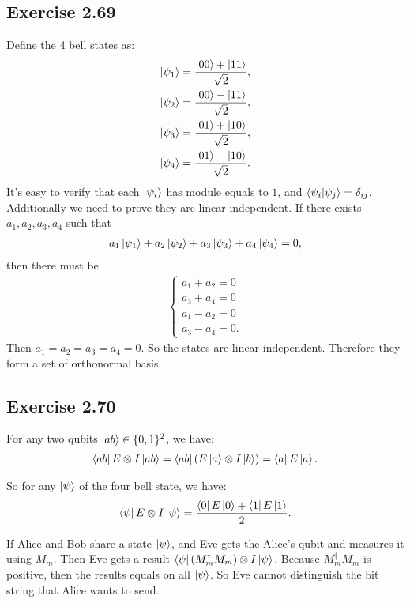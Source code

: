 \subsection*{Exercise 2.69}
Define the 4 bell states as:
\begin{align}
    \ket{\psi_1}=\frac{\ket{00}+\ket{11}}{\sqrt 2},\\
    \ket{\psi_2}=\frac{\ket{00}-\ket{11}}{\sqrt 2},\\
    \ket{\psi_3}=\frac{\ket{01}+\ket{10}}{\sqrt 2},\\
    \ket{\psi_4}=\frac{\ket{01}-\ket{10}}{\sqrt 2}.
\end{align}
It's easy to verify that each $\ket{\psi_i}$ has module equals to $1$, and $\bra{\psi_i}\ket{\psi_j}=\delta_{ij}$. Additionally we need to prove they are linear independent. If there exists $a_1,a_2,a_3,a_4$ such that
\begin{align}
    a_1\ket{\psi_1}+a_2\ket{\psi_2}+a_3\ket{\psi_3}+a_4\ket{\psi_4}=0,
\end{align}
then there must be
\begin{align}
    \left\{\begin{array}{l}
a_{1}+a_{2}=0 \\
a_{3}+a_{4}=0 \\
a_{1}-a_{2}=0 \\
a_{3}-a_{4}=0 .
\end{array}\right.
\end{align}
Then $a_1=a_2=a_3=a_4=0$. So the states are linear independent. Therefore they form a set of orthonormal basis.

\subsection*{Exercise 2.70}

For any two qubits $\ket{ab}\in\{0,1\}^2$, we have:
\begin{align}
    \bra{ab}E\otimes I\ket{ab} = \bra{ab}(E\ket{a}\otimes I\ket{b})=\bra{a}E\ket{a}.
\end{align}

So for any $\ket{\psi}$ of the four bell state, we have:
\begin{align}
    \bra{\psi}E\otimes I\ket{\psi} = \frac{\bra{0}E\ket{0}+\bra{1}E\ket{1}}{2}.
\end{align}

If Alice and Bob share a state $\ket{\psi}$, and Eve gets the Alice's qubit and measures it using $M_m$. Then Eve gets a result $\bra{\psi}(M_m^\dagger M_m)\otimes I\ket{\psi}$. Because $M_m^\dagger M_m$ is positive, then the results equals on all $\ket{\psi}$. So Eve cannot distinguish the bit string that Alice wants to send.


